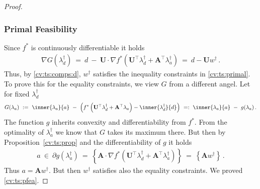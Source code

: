 \begin{proof}
\subsubsection*{Primal Feasibility}
Since $f^*$ is continuously differentiable it holds
\begin{gather*}
  \nabla G(\lambda_d^\dagger)
  \ 
  =
  \ 
  d
  \ 
  -
  \ 
  \mathbf{U}
  \cdot
  \nabla
    f^*
    \left( 
      \mathbf{U}^\top  \lambda_d^\dagger
      +
      \mathbf{A}^\top  \lambda_a^\dagger
    \right)
    \ 
  =
  \ 
  d
  -
  \mathbf{U}w^\dagger
  \,.
\end{gather*}
Thus, by \eqref{cv:ts:comps:d},
$w^\dagger$ satisfies the inequality constraints in \eqref{cv:ts:primal}. 
To prove this for the equality constraints,
we view $G$ from a different angel. Let for fixed
$\lambda^\dagger_d$
\begin{gather*}
  G(\lambda_a)
  \ 
  :=
  \ 
  \inner
  {\lambda_a}{a}
  \ 
  -
  \ 
  \left( 
    f^*
    \left( 
      \mathbf{U}^\top  \lambda_d^\dagger
      +
      \mathbf{A}^\top  \lambda_a
    \right)
    -
  \inner
  {\lambda_d^\dagger}{d}
  \right)
  \ 
  =:
  \ 
  \inner
  {\lambda_a}{a}
  \ 
  -
  \ 
  g(\lambda_a)
  \,
  .
\end{gather*}
The function $g$ inherits convexity and differentiability from 
$f^*$.
From the optimality of $\lambda_a^\dagger$ we know that
$G$ takes its maximum there. But then by Proposition~\ref{cv:ts:prop}
and the differentiability of $g$ it holds
\begin{gather}
  a
  \ 
  \in
  \ 
  \partial
  g(\lambda_a^\dagger)
  \ 
  =
  \ 
  \left\{ 
    \mathbf{A}
    \cdot
    \nabla
    f^*
    \left( 
      \mathbf{U}^\top  \lambda_d^\dagger
      +
      \mathbf{A}^\top  \lambda_a^\dagger
    \right)
  \right\}
  \ 
  =
  \ 
  \left\{ 
    \mathbf{A}
    w^\dagger
  \right\}
  \,.
\end{gather}
Thus $a=
    \mathbf{A}
    w^\dagger
$. But then $w^\dagger$ satisfies also the equality constraints.
We proved \eqref{cv:ts:pfea}.

\end{proof}

